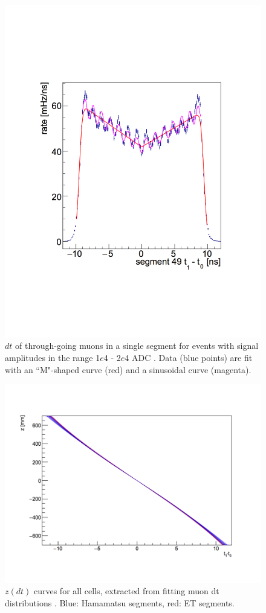 \begin{figure}[h]
\begin{minipage}[h]{0.5\linewidth}
		\includegraphics[width=0.85\linewidth]{tex/5-analysis-images/HobbesFit}
		\caption[Muon $dt$ for a single segment]{$dt$ of through-going muons in a single segment for events with signal amplitudes in the range  1$e$4 -  2$e$4 ADC \cite{MM:2314}. Data (blue points) are fit with an ``M"-shaped curve (red) and a sinusoidal curve (magenta).}
		\label{fig:hobbesfit}
	\end{minipage}
\end{figure}

\begin{figure}[H]
	\centering
	\includegraphics[width=0.5\linewidth]{tex/5-analysis-images/z_vs_dt}
	\caption[$z(dt)$ curves for all cells]{$z(dt)$ curves for all cells, extracted from fitting muon dt distributions \cite{MM:2314}. Blue: Hamamatsu segments, red: ET segments.}
	\label{fig:zvsdt}
\end{figure}

